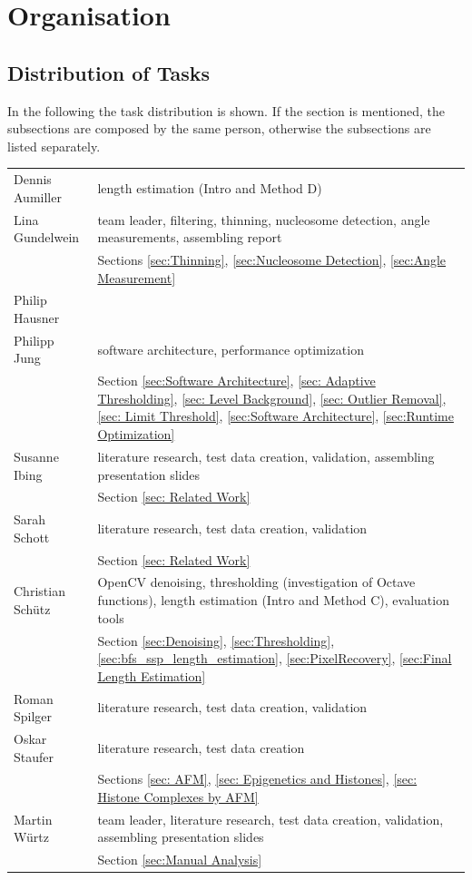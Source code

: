 \documentclass{article}
\begin{document}
\section{Organisation}

\subsection{Distribution of Tasks}
In the following the task distribution is shown. If the section is mentioned, the subsections are composed by the same person, otherwise the subsections are listed separately.

\begin{table}[htb]\label{tab: tasks}
\begin{tabular}{p{2.8cm}p{8.3cm}}
Dennis Aumiller & length estimation (Intro and Method D)\\[1em]
Lina Gundelwein & team leader, filtering, thinning, nucleosome detection, angle measurements, assembling report\\
&Sections \ref{sec:Thinning}, \ref{sec:Nucleosome Detection}, \ref{sec:Angle Measurement}\\[1em]
Philip Hausner& \\[1em]
Philipp Jung &  software architecture, performance optimization\\
&Section \ref{sec:Software Architecture}, \ref{sec: Adaptive Thresholding}, \ref{sec: Level Background}, \ref{sec: Outlier Removal}, \ref{sec: Limit Threshold}, \ref{sec:Software Architecture}, \ref{sec:Runtime Optimization}\\[1em]
Susanne Ibing & literature research, test data creation, validation, assembling presentation slides\\
& Section \ref{sec: Related Work}\\[1em]
Sarah Schott & literature research, test data creation, validation\\
& Section \ref{sec: Related Work}\\[1em]
Christian Schütz& OpenCV denoising, thresholding (investigation of Octave functions), length estimation (Intro and Method C), evaluation tools\\[1em]
& Section \ref{sec:Denoising}, \ref{sec:Thresholding}, \ref{sec:bfs_ssp_length_estimation}, \ref{sec:PixelRecovery}, \ref{sec:Final Length Estimation}\\[1em]
Roman Spilger& literature research, test data creation, validation\\[1em]
Oskar Staufer & literature research, test data creation \\
& Sections \ref{sec: AFM}, \ref{sec: Epigenetics and Histones}, \ref{sec: Histone Complexes by AFM} \\[1em]
Martin Würtz & team leader, literature research, test data creation, validation, assembling presentation slides\\
&Section \ref{sec:Manual Analysis}\\
\end{tabular}
\end{table}
\end{document}

